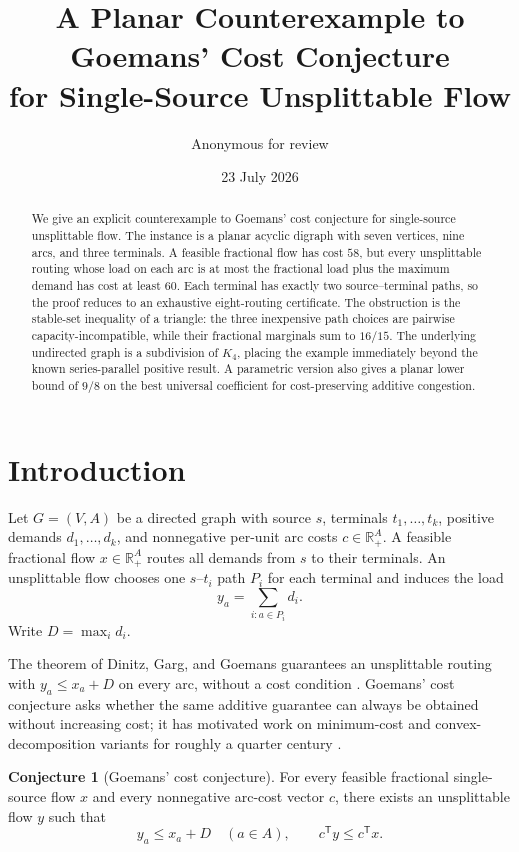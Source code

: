 \documentclass[11pt]{article}
\title{A Planar Counterexample to Goemans' Cost Conjecture\\
for Single-Source Unsplittable Flow}
\author{Anonymous for review}
\date{23 July 2026}
\theoremstyle{definition}
\newtheorem{conjecture}[theorem]{Conjecture}
\newcommand{\R}{\mathbb{R}}
\newcommand{\1}{\mathbf{1}}
\begin{document}
\maketitle

\begin{abstract}
We give an explicit counterexample to Goemans' cost conjecture for
single-source unsplittable flow.  The instance is a planar acyclic digraph
with seven vertices, nine arcs, and three terminals.  A feasible fractional
flow has cost $58$, but every unsplittable routing whose load on each arc is
at most the fractional load plus the maximum demand has cost at least $60$.
Each terminal has exactly two source--terminal paths, so the proof reduces to
an exhaustive eight-routing certificate.  The obstruction is the
stable-set inequality of a triangle: the three inexpensive path choices are
pairwise capacity-incompatible, while their fractional marginals sum to
$16/15$.  The underlying undirected graph is a subdivision of $K_4$, placing
the example immediately beyond the known series-parallel positive result.
A parametric version also gives a planar lower bound of $9/8$ on the best
universal coefficient for cost-preserving additive congestion.
\end{abstract}

\section{Introduction}

Let $G=(V,A)$ be a directed graph with source $s$, terminals
$t_1,\ldots,t_k$, positive demands $d_1,\ldots,d_k$, and nonnegative per-unit
arc costs $c\in\R_+^A$.  A feasible fractional flow $x\in\R_+^A$ routes all
demands from $s$ to their terminals.  An unsplittable flow chooses one
$s$--$t_i$ path $P_i$ for each terminal and induces the load
\[
 y_a=\sum_{i:a\in P_i}d_i.
\]
Write $D=\max_i d_i$.

The theorem of Dinitz, Garg, and Goemans guarantees an unsplittable routing
with $y_a\le x_a+D$ on every arc, without a cost condition
\citep{DinitzGargGoemans1999}.  Goemans' cost conjecture asks whether the same
additive guarantee can always be obtained without increasing cost; it has
motivated work on minimum-cost and convex-decomposition variants for roughly
a quarter century \citep{Skutella2002,MartensSalazarSkutella2007}.

\begin{conjecture}[Goemans' cost conjecture]\label{conj:goemans}
For every feasible fractional single-source flow $x$ and every nonnegative
arc-cost vector $c$, there exists an unsplittable flow $y$ such that
\[
 y_a\le x_a+D\quad(a\in A),
 \qquad
 c^\mathsf{T}y\le c^\mathsf{T}x.
\]
\end{conjecture}
\end{document}
